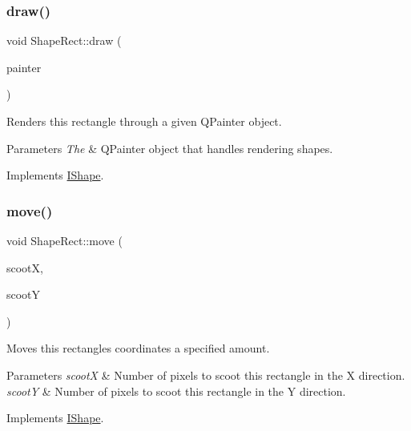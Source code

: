 \subsubsection{\texorpdfstring{draw()}{draw()}}
{\footnotesize\ttfamily void Shape\+Rect\+::draw (\begin{DoxyParamCaption}\item[{Q\+Painter \&}]{painter }\end{DoxyParamCaption})\hspace{0.3cm}{\ttfamily [virtual]}}



Renders this rectangle through a given Q\+Painter object. 


\begin{DoxyParams}{Parameters}
{\em The} & Q\+Painter object that handles rendering shapes. \\
\hline
\end{DoxyParams}


Implements \mbox{\hyperlink{class_i_shape_ad97c626e7e2c9afb9f51efc41b836e6f}{I\+Shape}}.

\mbox{\label{class_shape_rect_a79fcc5998d54d1bfd851646479804b32}} 
\subsubsection{\texorpdfstring{move()}{move()}}
{\footnotesize\ttfamily void Shape\+Rect\+::move (\begin{DoxyParamCaption}\item[{int}]{scootX,  }\item[{int}]{scootY }\end{DoxyParamCaption})\hspace{0.3cm}{\ttfamily [virtual]}}



Moves this rectangle\textquotesingle{}s coordinates a specified amount. 


\begin{DoxyParams}{Parameters}
{\em scootX} & Number of pixels to scoot this rectangle in the X direction. \\
\hline
{\em scootY} & Number of pixels to scoot this rectangle in the Y direction. \\
\hline
\end{DoxyParams}


Implements \mbox{\hyperlink{class_i_shape_a3d23494cd34e658cc6b39a2e2db0b7fe}{I\+Shape}}.

